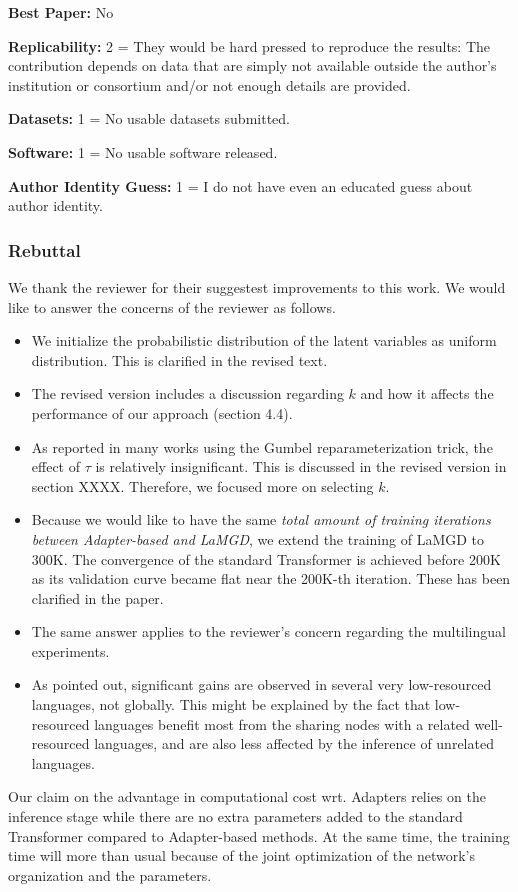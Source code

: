 \documentclass[12pt,times,a4paper,twoside]{article}
\theoremstyle{definition}
\begin{document}
\textbf{Best Paper:} No

\textbf{Replicability:} 2 = They would be hard pressed to reproduce the results: The contribution depends on data that are simply not available outside the author's institution or consortium and/or not enough details are provided.

\textbf{Datasets:} 1 = No usable datasets submitted.

\textbf{Software:} 1 = No usable software released.

\textbf{Author Identity Guess:} 1 = I do not have even an educated guess about author identity.

\subsubsection*{Rebuttal}
{\color{blue}%
We thank the reviewer for their suggestest improvements to this work. We would like to answer the concerns of the reviewer as follows.

\begin{itemize}
\item We initialize the probabilistic distribution of the latent variables as uniform distribution. This is clarified in the revised text.
\item The revised version includes a discussion  regarding $k$ and how it affects the performance of our approach (section 4.4).
\item As reported in many works using the Gumbel reparameterization trick, the effect of $\tau$ is relatively insignificant. This is discussed in the revised version in section XXXX. Therefore, we focused more on selecting $k$. 
\item Because we would like to have the same \emph{total amount of training iterations between Adapter-based and LaMGD}, we extend the training of LaMGD to 300K. The convergence of the standard Transformer is achieved before 200K as its validation curve became flat near the 200K-th iteration. These has been clarified in the paper. 
\item The same answer applies to the reviewer's concern regarding the multilingual experiments.
\item As pointed out, significant gains are observed in several very low-resourced languages, not globally. This might be explained by the fact that low-resourced languages benefit most from the sharing nodes with a related well-resourced languages, and are also less affected by the inference of unrelated languages.
\end{itemize}

Our claim on the advantage in computational cost wrt. Adapters relies on the inference stage while there are no extra parameters added to the standard Transformer compared to Adapter-based methods. At the same time, the training time will  more than usual because of the joint optimization of the network's organization and the parameters. 
}%
\end{document}
